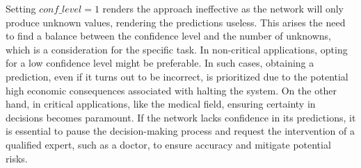 Setting $conf \_ level = 1$ renders the approach ineffective as the network will only produce unknown values, rendering the predictions useless. This arises the need to find a balance between the confidence level and the number of unknowns, which is a consideration for the specific task. In non-critical applications, opting for a low confidence level might be preferable. In such cases, obtaining a prediction, even if it turns out to be incorrect, is prioritized due to the potential high economic consequences associated with halting the system. On the other hand, in critical applications, like the medical field, ensuring certainty in decisions becomes paramount. If the network lacks confidence in its predictions, it is essential to pause the decision-making process and request the intervention of a qualified expert, such as a doctor, to ensure accuracy and mitigate potential risks.